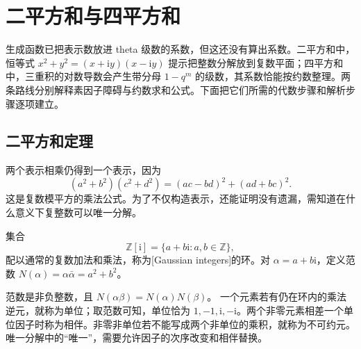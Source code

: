 \section{二平方和与四平方和}
\label{b3:sec:2404}

生成函数已把表示数放进 theta 级数的系数，但这还没有算出系数。二平方和中，恒等式 \(x^2+y^2=(x+\mathrm{i}y)(x-\mathrm{i}y)\) 提示把整数分解放到复数平面；四平方和中，三重积的对数导数会产生带分母 \(1-q^m\) 的级数，其系数恰能按约数整理。两条路线分别解释素因子障碍与约数求和公式。下面把它们所需的代数步骤和解析步骤逐项建立。

\subsection{二平方和定理}
\label{b3:subsec:240401}

两个表示相乘仍得到一个表示，因为
\[
(a^2+b^2)(c^2+d^2)=(ac-bd)^2+(ad+bc)^2.
\]
这是复数模平方的乘法公式。为了不仅构造表示，还能证明没有遗漏，需知道在什么意义下复整数可以唯一分解。

\begin{definition}\label{b3:def:24-gaussian-integers}
集合
\[
\mathbb Z[\mathrm{i}]=\{a+b\mathrm{i}:a,b\in\mathbb Z\},
\]
配以通常的复数加法和乘法，称为[Gaussian integers]的环。对 \(\alpha=a+b\mathrm{i}\)，定义范数
\(N(\alpha)=\alpha\bar\alpha=a^2+b^2\)。
\end{definition}

范数是非负整数，且 \(N(\alpha\beta)=N(\alpha)N(\beta)\)。
一个元素若有仍在环内的乘法逆元，就称为单位；取范数可知，单位恰为 \(1,-1,\mathrm{i},-\mathrm{i}\)。两个非零元素相差一个单位因子时称为相伴。非零非单位若不能写成两个非单位的乘积，就称为不可约元。唯一分解中的“唯一”，需要允许因子的次序改变和相伴替换。

